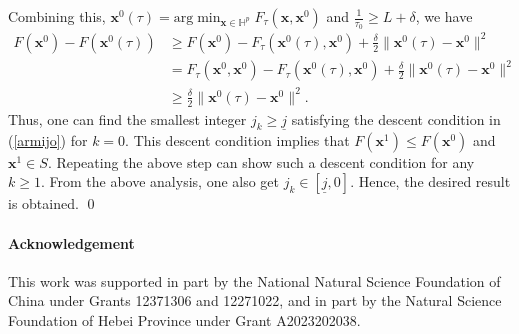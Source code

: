 \documentclass{article}
\numberwithin{equation}{section}
\begin{document}
Combining this, $\mathbf{x}^0(\tau)=\mathrm{arg}\min_{\mathbf{x}\in\mathbb{H}^p}F_{\tau}(\mathbf{x},\mathbf{x}^0)$ and $\frac{1}{\tau_0}\geq L+\delta$, we have
 \begin{equation}\label{fkdec}
\begin{aligned}
F(\mathbf{x}^0)-F(\mathbf{x}^0(\tau))
& \geq
F(\mathbf{x}^0)-F_{\tau}(\mathbf{x}^0(\tau),\mathbf{x}^0)+\frac{\delta}{2}\|\mathbf{x}^0(\tau)-\mathbf{x}^0\|^2\nonumber\\
&=F_{\tau}(\mathbf{x}^0,\mathbf{x}^0)-F_{\tau}(\mathbf{x}^0(\tau),\mathbf{x}^0)+\frac{\delta}{2}\|\mathbf{x}^0(\tau)-\mathbf{x}^0\|^2\nonumber\\
& \geq
\frac{\delta}{2}\|\mathbf{x}^0(\tau)-\mathbf{x}^0\|^2.\nonumber
\end{aligned}
 \end{equation}
Thus, one can find the smallest integer $j_k\geq\underline{j}$ satisfying the descent condition in (\ref{armijo}) for $k=0$. This descent condition implies that $F(\mathbf{x}^1)\leq F(\mathbf{x}^0)$ and $\mathbf{x}^1\in S$. Repeating the above step can show such a descent condition for any $k\geq1.$ From the above analysis, one also get $j_k\in[\underline{j}, 0]$. Hence, the desired result is obtained.
\qed






\paragraph{Acknowledgement}

This work was supported in part by the National Natural Science Foundation
of China under Grants 12371306 and 12271022, and in part by the Natural Science Foundation of Hebei Province under Grant A2023202038.




\end{document}
